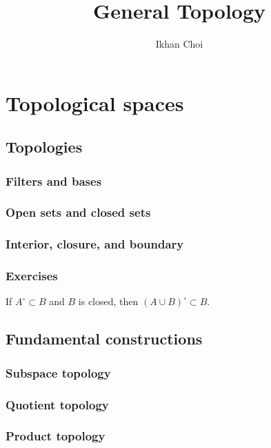 \documentclass{../../large}
\begin{document}
\title{General Topology}
\author{Ikhan Choi}
\maketitle
\tableofcontents

\part{Topological spaces}


\chapter{Topologies}

\section{Filters and bases}
\section{Open sets and closed sets}
\section{Interior, closure, and boundary}


\section*{Exercises}

\begin{prb}
If $A^\circ\subset B$ and $B$ is closed, then $(A\cup B)^\circ\subset B$.
\end{prb}




\chapter{Fundamental constructions}
\section{Subspace topology}
\section{Quotient topology}
\section{Product topology}
\end{document}
